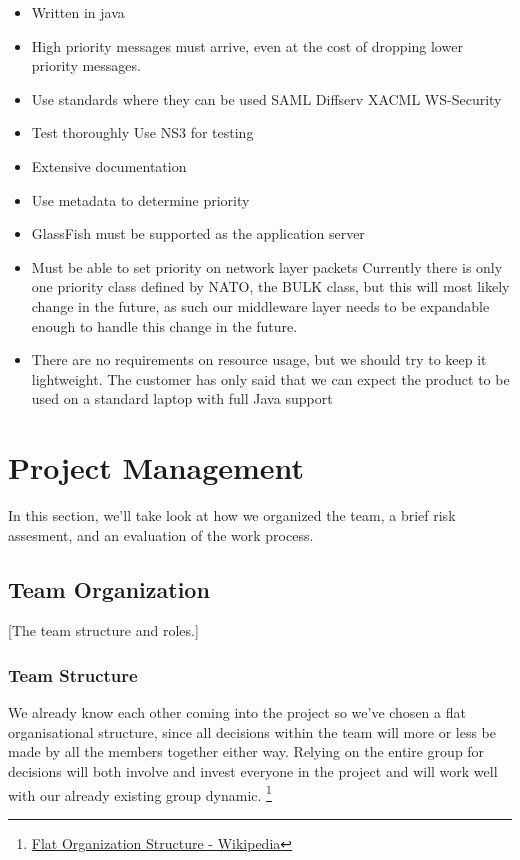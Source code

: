 \documentclass[12pt]{article}
\begin{document}
    \begin{itemize}
        \item Written in java
        \item High priority messages must arrive, even at the cost of dropping lower priority messages.
        \item Use standards where they can be used
            \subitem SAML
            \subitem Diffserv
            \subitem XACML
            \subitem WS-Security
        \item Test thoroughly
            \subitem Use NS3 for testing
        \item Extensive documentation
        \item Use metadata to determine priority
        \item GlassFish must be supported as the application server
        \item Must be able to set priority on network layer packets
            \subitem Currently there is only one priority class defined by NATO, the BULK class, but this will most likely change in the future, as such our middleware layer needs to be expandable enough to handle this change in the future.
        \item There are no requirements on resource usage, but we should try to keep it lightweight.
            \subitem The customer has only said that we can expect the product to be used on a standard laptop with full Java support
    \end{itemize}
    
\section{Project Management}\label{management} 
    In this section, we'll take look at how we organized the team, a brief risk assesment, and an evaluation of the work process. 
    
    \subsection{Team Organization}\label{team} 
        [The team structure and roles.]
    
    \subsubsection{Team Structure}
    We already know each other coming into the project so we’ve chosen a flat organisational structure, since all decisions within the team will more or less be made by all the members together either way. Relying on the entire group for decisions will both involve and invest everyone in the project and will work well with our already existing group dynamic.
    \footnote{ 
        \href{http://en.wikipedia.org/wiki/Flat_organization}{Flat Organization Structure - Wikipedia} 
    }
    
\end{document}
